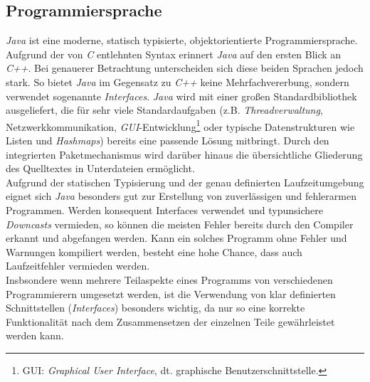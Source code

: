     \subsection{Programmiersprache}
        \emph{Java} ist eine moderne, statisch typisierte, objektorientierte Programmiersprache. Aufgrund der von 
        \emph{C} entlehnten Syntax erinnert \emph{Java} auf den ersten Blick an \emph{C++}. Bei genauerer 
        Betrachtung unterscheiden sich diese beiden Sprachen jedoch stark. So bietet \emph{Java} im Gegensatz zu 
        \emph{C++} keine Mehrfachvererbung, sondern verwendet sogenannte \emph{Interfaces}. \emph{Java} wird mit einer 
        großen Standardbibliothek ausgeliefert, die für sehr viele Standardaufgaben
        (z.B. \emph{Threadverwaltung}, Netzwerkkommunikation, \emph{GUI}-Entwicklung\footnote{GUI: 
         \emph{Graphical User Interface}, dt.  graphische Benutzerschnittstelle.} oder typische Datenstrukturen wie Listen und
         \emph{Hashmaps}) bereits eine
        passende Lösung mitbringt. Durch den integrierten Paketmechanismus wird darüber hinaus die übersichtliche
        Gliederung des Quelltextes in Unterdateien ermöglicht.\\
        Aufgrund der statischen Typisierung und der genau definierten Laufzeitumgebung eignet sich \emph{Java} besonders
        gut zur Erstellung von zuverlässigen und fehlerarmen Programmen. Werden konsequent Interfaces verwendet und
        typunsichere \emph{Downcasts} vermieden, so können die meisten Fehler bereits durch den Compiler erkannt und 
        abgefangen werden. Kann ein solches Programm ohne Fehler und Warnungen kompiliert werden, besteht eine hohe Chance,
        dass auch Laufzeitfehler vermieden werden.\\
        Insbsondere wenn mehrere Teilaspekte eines Programms von verschiedenen Programmierern umgesetzt werden, 
        ist die Verwendung von klar definierten Schnittstellen (\emph{Interfaces}) besonders wichtig, da nur so eine korrekte
        Funktionalität nach dem Zusammensetzen der einzelnen Teile gewährleistet werden kann.

